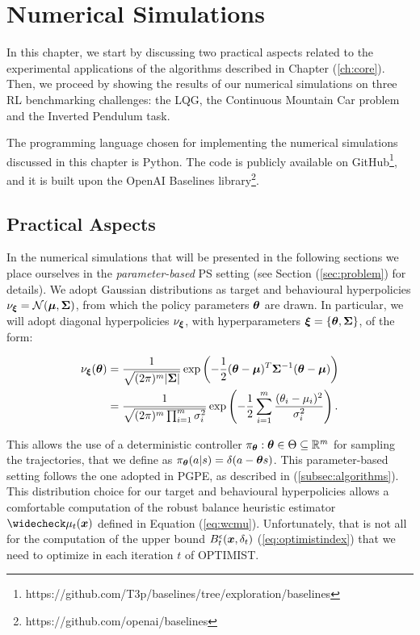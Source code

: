 
\chapter{Numerical Simulations} \label{ch:experiments}
In this chapter, we start by discussing two practical aspects related to the experimental applications of the algorithms described in Chapter (\ref{ch:core}). Then, we proceed by showing the results of our numerical simulations on three \gls{RL} benchmarking challenges: the \gls{LQG}, the Continuous Mountain Car problem and the Inverted Pendulum task.

The programming language chosen for implementing the numerical simulations discussed in this chapter is Python. The code is publicly available on GitHub\footnote{https://github.com/T3p/baselines/tree/exploration/baselines}, and it is built upon the OpenAI Baselines library\footnote{https://github.com/openai/baselines}.

\section{Practical Aspects} \label{sec:practical}
In the numerical simulations that will be presented in the following sections we place ourselves in the \emph{parameter-based} \gls{PS} setting (see Section (\ref{sec:problem}) for details). We adopt Gaussian distributions as target and behavioural hyperpolicies $\nu_{\boldsymbol{\xi}}= \mathcal{N}(\boldsymbol{\mu},\boldsymbol{\Sigma})$, from which the policy parameters $\boldsymbol{\theta}$ are drawn. In particular, we will adopt diagonal hyperpolicies $\nu_{\boldsymbol{\xi}}$, with hyperparameters $\boldsymbol{\xi}=\{\boldsymbol{\theta},\boldsymbol{\Sigma}\}$, of the form: 

\begin{align}
\nu_{\boldsymbol{\xi}}(\boldsymbol{\theta}) & = \frac{1}{\sqrt{(2\pi)^m |\boldsymbol{\Sigma} |}}\exp\left(
	-\frac{1}{2} (\boldsymbol{\theta} - \boldsymbol{\mu} )^T\boldsymbol{\Sigma}^{-1}(\boldsymbol{\theta} - \boldsymbol{\mu} )\right)\\
	& = \frac{1}{\sqrt{(2\pi)^m \prod_{i=1}^{m} \sigma_{i}^2}}\exp\left(
	-\frac{1}{2} \sum\limits_{i=1}^m\frac{(\theta_{i}-\mu_{i})^2}{\sigma_{i}^2}\right).
\end{align}

This allows the use of a deterministic controller $\pi_{\boldsymbol{\theta}}: \boldsymbol{\theta}\in\Theta\subseteq\mathbb{R}^m$ for sampling the trajectories, that we define as $\pi_{\boldsymbol{\theta}}(a|s)=\delta(a-\boldsymbol{\theta} s)$. This parameter-based setting follows the one adopted in \gls{PGPE}, as described in (\ref{subsec:algorithms}). \\
This distribution choice for our target and behavioural hyperpolicies allows a comfortable computation of the robust balance heuristic estimator $\wc{\mu}_t(\vx)$ defined in Equation (\ref{eq:wcmu}). Unfortunately, that is not all for the computation of the upper bound $B_t^{\epsilon}(\boldsymbol{x},\delta_t)$ (\ref{eq:optimistindex}) that we need to optimize in each iteration $t$ of \gls{OPTIMIST}.

